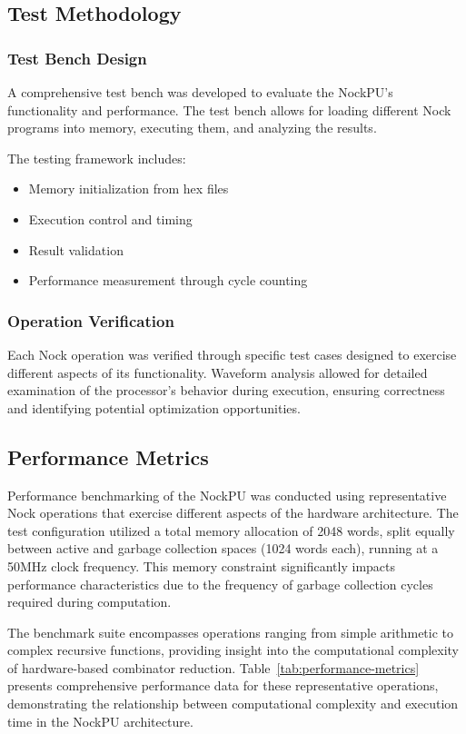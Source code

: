 \documentclass[twoside]{article}
\begin{document}
\subsection{Test Methodology}

\subsubsection{Test Bench Design}

A comprehensive test bench was developed to evaluate the NockPU's functionality and performance. The test bench allows for loading different Nock programs into memory, executing them, and analyzing the results.

The testing framework includes:
\begin{itemize}
  \item Memory initialization from hex files
  \item Execution control and timing
  \item Result validation
  \item Performance measurement through cycle counting
\end{itemize}

\subsubsection{Operation Verification}

Each Nock operation was verified through specific test cases designed to exercise different aspects of its functionality. Waveform analysis allowed for detailed examination of the processor's behavior during execution, ensuring correctness and identifying potential optimization opportunities.

\subsection{Performance Metrics}

Performance benchmarking of the NockPU was conducted using representative Nock operations that exercise different aspects of the hardware architecture. The test configuration utilized a total memory allocation of 2048 words, split equally between active and garbage collection spaces (1024 words each), running at a 50MHz clock frequency. This memory constraint significantly impacts performance characteristics due to the frequency of garbage collection cycles required during computation.

The benchmark suite encompasses operations ranging from simple arithmetic to complex recursive functions, providing insight into the computational complexity of hardware-based combinator reduction. Table~\ref{tab:performance-metrics} presents comprehensive performance data for these representative operations, demonstrating the relationship between computational complexity and execution time in the NockPU architecture.
\end{document}
